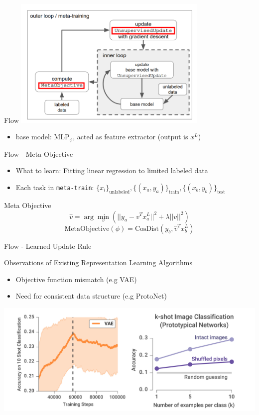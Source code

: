 \documentclass{beamer}
\begin{document}
\begin{frame}{Flow}
  \center \includegraphics[width=0.7\textwidth]{fig/flow-anno.png}
  \begin{itemize}
    \item base model: $\text{MLP}_{\phi}$, acted as feature extractor (output is $x^L$)
  \end{itemize}
\end{frame}

\begin{frame}{Flow - Meta Objective}
  \begin{itemize}
    \item What to learn: Fitting linear regression to limited labeled data 
    \item Each task in \texttt{meta-train}: $\lbrace x_i \rbrace_{\text{unlabeled}}, \lbrace (x_a,y_a) \rbrace_\text{train}, \lbrace (x_b,y_b) \rbrace_\text{test}$
  \end{itemize}
  
  \begin{block}{Meta Objective}
    \[ \hat{v} = \arg \min_v (||y_a - v^Tx_a^L||^2 + \lambda ||v||^2) \]
    \[ \text{MetaObjective}(\phi) = \text{CosDist}(y_b,\hat{v}^Tx_b^L) \]
  \end{block}
  
\end{frame}

\begin{frame}{Flow - Learned Update Rule}
\end{frame}

\begin{frame}{Observations of Existing Representation Learning Algorithms}
  \begin{itemize}
    \item Objective function mismatch (e.g VAE)
    \item Need for consistent data structure (e.g ProtoNet)
  \end{itemize}
  \center \includegraphics[width=\textwidth]{fig/obs.png}

\end{frame}
\end{document}
